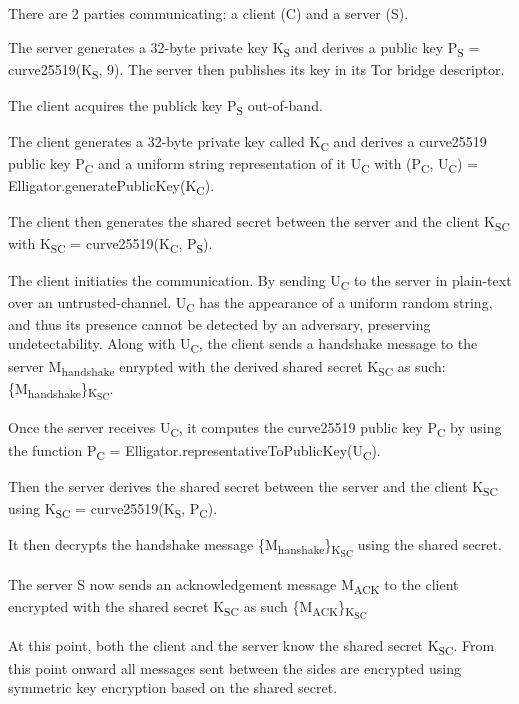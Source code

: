 \documentclass[11pt]{book} %
\begin{document}
There are 2 parties communicating: a client (C) and a server (S).

The server generates a 32-byte private key K\textsubscript{S} and derives a public key P\textsubscript{S} = curve25519(K\textsubscript{S}, 9). The server then publishes its key in its Tor bridge descriptor.

The client acquires the publick key P\textsubscript{S} out-of-band.

The client generates a 32-byte private key called K\textsubscript{C} and derives a curve25519 public key P\textsubscript{C} and a uniform string representation of it U\textsubscript{C} with (P\textsubscript{C}, U\textsubscript{C}) = Elligator.generatePublicKey(K\textsubscript{C}).

The client then generates the shared secret between the server and the client K\textsubscript{SC} with K\textsubscript{SC} = curve25519(K\textsubscript{C},  P\textsubscript{S}).

The client initiaties the communication. By sending U\textsubscript{C} to the server in plain-text over an untrusted-channel. U\textsubscript{C} has the appearance of a uniform random string, and thus its presence cannot be detected by an adversary, preserving undetectability. Along with U\textsubscript{C}, the client sends a handshake message to the server M\textsubscript{handshake} enrypted with the derived shared secret K\textsubscript{SC} as such: \{M\textsubscript{handshake}\}\textsubscript{K\textsubscript{SC}}.

Once the server receives U\textsubscript{C}, it computes the curve25519 public key P\textsubscript{C} by using the function P\textsubscript{C} = Elligator.representativeToPublicKey(U\textsubscript{C}).

Then the server derives the shared secret between the server and the client K\textsubscript{SC} using K\textsubscript{SC} = curve25519(K\textsubscript{S}, P\textsubscript{C}).

It then decrypts the handshake message \{M\textsubscript{hanshake}\}\textsubscript{K\textsubscript{SC}} using the shared secret.

The server S now sends an acknowledgement message M\textsubscript{ACK} to the client encrypted with the shared secret K\textsubscript{SC} as such 
\{M\textsubscript{ACK}\}\textsubscript{K\textsubscript{SC}}

At this point, both the client and the server know the shared secret K\textsubscript{SC}. From this point onward all messages sent between the sides are encrypted using symmetric key encryption based on the shared secret.
\end{document}
